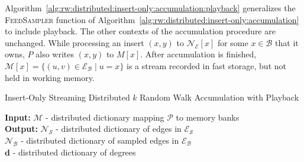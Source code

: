 \documentclass[10]{article}
\newcommand{\algoname}[1]{\textnormal{\textsc{#1}}}
\begin{document}
Algorithm~\ref{alg:rw:distributed:insert-only:accumulation:playback} generalizes the \algoname{FeedSampler} function of Algorithm~\ref{alg:rw:distributed:insert-only:accumulation} to include playback.
The other contexts of the accumulation procedure are unchanged.
While processing an insert $(x, y)$ to $\mathcal{N}_\mathcal{E}[x]$ for some $x \in \mathcal{B}$ that it owns, $P$ also writes $(x,y)$ to $M[x]$.
After accumulation is finished, $\mathcal{M}[x] = \{ (u, v) \in \mathcal{E}_\mathcal{B} \mid u = x\}$ is a stream recorded in fast storage, but not held in working memory.

\begin{algorithm}[htbp] 
\caption{Insert-Only Streaming Distributed $k$ Random Walk Accumulation with Playback}\label{alg:rw:distributed:insert-only:accumulation:playback}
\begin{flushleft}
        \textbf{Input:} 		%
        		$\mathcal{M}$ - distributed dictionary mapping $\mathcal{P}$ to memory banks	 \\
        \textbf{Output:} $\mathcal{N}_\mathcal{S}$ - distributed dictionary of edges in $\mathcal{E}_\mathcal{S}$ \\
        	\hspace{4.05em}	$\mathcal{N}_\mathcal{B}$ - distributed dictionary of sampled edges in $\mathcal{E}_\mathcal{B}$ \\
        	\hspace{4.05em}	$\mathbf{d}$ - distributed dictionary of degrees

\end{flushleft}
\end{algorithm}
\end{document}
